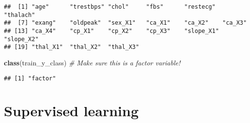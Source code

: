 \documentclass[
]{book}
\newenvironment{Shaded}{\begin{snugshade}}{\end{snugshade}}
\newcommand{\CommentTok}[1]{\textcolor[rgb]{0.56,0.35,0.01}{\textit{#1}}}
\newcommand{\KeywordTok}[1]{\textcolor[rgb]{0.13,0.29,0.53}{\textbf{#1}}}
\newcommand{\NormalTok}[1]{#1}
\newcommand{\OperatorTok}[1]{\textcolor[rgb]{0.81,0.36,0.00}{\textbf{#1}}}
\newcommand{\StringTok}[1]{\textcolor[rgb]{0.31,0.60,0.02}{#1}}
\begin{document}
\begin{Shaded}
\end{Shaded}

\begin{verbatim}
##  [1] "age"      "trestbps" "chol"     "fbs"      "restecg"  "thalach" 
##  [7] "exang"    "oldpeak"  "sex_X1"   "ca_X1"    "ca_X2"    "ca_X3"   
## [13] "ca_X4"    "cp_X1"    "cp_X2"    "cp_X3"    "slope_X1" "slope_X2"
## [19] "thal_X1"  "thal_X2"  "thal_X3"
\end{verbatim}

\begin{Shaded}
\begin{Highlighting}[]
\KeywordTok{class}\NormalTok{(train\_y\_class) }\CommentTok{\# Make sure this is a factor variable!}
\end{Highlighting}
\end{Shaded}

\begin{verbatim}
## [1] "factor"
\end{verbatim}

\hypertarget{supervised-learning}{%
\section{Supervised learning}\label{supervised-learning}}
\end{document}
